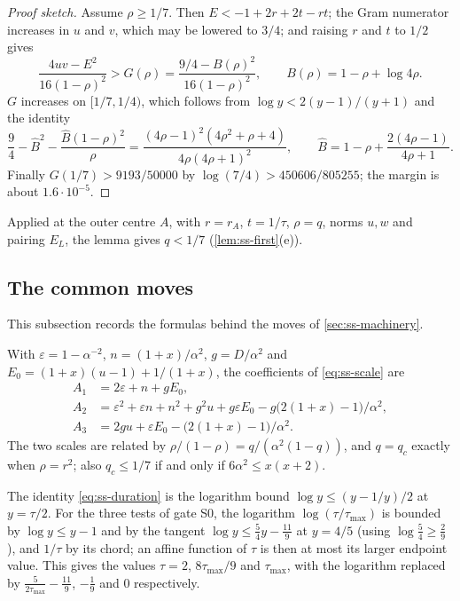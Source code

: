 \begin{proof}[Proof sketch]
Assume $\rho\ge1/7$. Then $E<-1+2r+2t-rt$; the Gram numerator increases in $u$ and $v$, which may
be lowered to $3/4$; and raising $r$ and $t$ to $1/2$ gives
\[
  \frac{4uv-E^2}{16(1-\rho)^2}>G(\rho)=\frac{9/4-B(\rho)^2}{16(1-\rho)^2},\qquad
  B(\rho)=1-\rho+\log4\rho .
\]
$G$ increases on $[1/7,1/4)$, which follows from $\log y<2(y-1)/(y+1)$ and the identity
\[
  \frac94-\hat B^2-\frac{\hat B(1-\rho)^2}{\rho}=\frac{(4\rho-1)^2(4\rho^2+\rho+4)}
  {4\rho(4\rho+1)^2},\qquad\hat B=1-\rho+\frac{2(4\rho-1)}{4\rho+1}.
\]
Finally $G(1/7)>9193/50000$ by $\log(7/4)>450606/805255$; the margin is about $1.6\cdot10^{-5}$.
\end{proof}

Applied at the outer centre $A$, with $r=r_A$, $t=1/\tau$, $\rho=q$, norms $u,w$ and pairing
$E_L$, the lemma gives $q<1/7$ (\cref{lem:ss-first}(e)).

\subsection{The common moves}\label{app:ss-moves}

This subsection records the formulas behind the moves of \cref{sec:ss-machinery}.

 With $\varepsilon=1-\alpha^{-2}$, $n=(1+x)/\alpha^2$,
$g=D/\alpha^2$ and $E_0=(1+x)(u-1)+1/(1+x)$, the coefficients of \eqref{eq:ss-scale} are
\begin{align*}
  A_1&=2\varepsilon+n+gE_0,\\
  A_2&=\varepsilon^2+\varepsilon n+n^2+g^2u+g\varepsilon E_0-g\bigl(2(1+x)-1\bigr)/\alpha^2,\\
  A_3&=2gu+\varepsilon E_0-\bigl(2(1+x)-1\bigr)/\alpha^2.
\end{align*}
The two scales are related by $\rho/(1-\rho)=q/(\alpha^2(1-q))$, and $q=q_c$ exactly when
$\rho=r^2$; also $q_c\le1/7$ if and only if $6\alpha^2\le x(x+2)$.

 The identity \eqref{eq:ss-duration} is the logarithm bound
$\log y\le(y-1/y)/2$ at $y=\tau/2$. For the three tests of gate S0, the logarithm
$\log(\tau/\tau_{\max})$ is bounded by $\log y\le y-1$ and by the tangent
$\log y\le\frac54y-\frac{11}{9}$ at $y=4/5$ (using $\log\frac54\ge\frac29$), and $1/\tau$ by its
chord; an affine function of $\tau$ is then at most its larger endpoint value. This gives the
values $\tau=2$, $8\tau_{\max}/9$ and $\tau_{\max}$, with the logarithm replaced by
$\frac{5}{2\tau_{\max}}-\frac{11}9$, $-\frac19$ and $0$ respectively.

